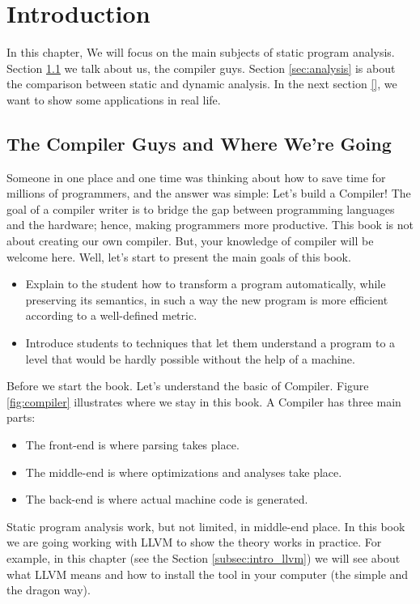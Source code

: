 \chapter{Introduction}
\label{ch:intro}

In this chapter, We will focus on the main subjects of static program analysis. 
Section \ref{sec:comp} we talk about us, the compiler guys. 
Section \ref{sec:analysis} is about the comparison between static and dynamic analysis. 
In the next section \ref{}, we want to show some applications in real life.  

\section{The Compiler Guys and Where We're Going}
\label{sec:comp}

Someone in one place and one time was thinking about how to save time for millions of programmers, and the answer was simple: Let's build a Compiler! The goal of a compiler writer is to bridge the gap between programming languages and the hardware; hence, making programmers more productive. This book is not about creating our own compiler. But, your knowledge of compiler will be welcome here. Well, let's start to present the main goals of this book.

\begin{itemize}
    \item Explain to the student how to transform a program automatically, while preserving its semantics, in such a way the new program is more efficient according to a well-defined metric.
    \item Introduce students to techniques that let them understand a program to a level that would be hardly possible without the help of a machine.
\end{itemize}

Before we start the book. Let's understand the basic of Compiler. Figure \ref{fig:compiler} illustrates where we stay in this book. A Compiler has three main parts:

\begin{itemize}
    \item The front-end is where parsing takes place.
    \item The middle-end is where optimizations and analyses take place.
    \item The back-end is where actual machine code is generated.
\end{itemize}

Static program analysis work, but not limited, in middle-end place. In this book we are going working with LLVM to show the theory works in practice. For example, in this chapter (see the Section \ref{subsec:intro_llvm}) we will see about what LLVM means and how to install the tool in your computer (the simple and the dragon way).  

